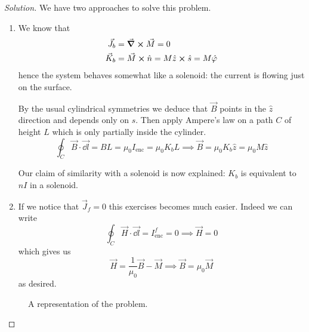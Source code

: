 \documentclass[12pt]{extarticle}
\begin{document}
\begin{proof}[Solution]
    We have two approaches to solve this problem.
    \begin{enumerate}
        \item We know that
              \begin{align}
                  \vec J_b & = \curl \vec M = 0                                               \\
                  \vec K_b & = \vec M \cross \hat n = M \hat z \cross \hat s = M \hat \varphi
              \end{align}
              hence the system behaves somewhat like a solenoid:
              the current is flowing just on the surface.

              By the usual cylindrical symmetries we deduce that $\vec B$ points in the $\hat z$ direction
              and depends only on $s$.
              Then apply Ampere's law on a path $C$ of height $L$ which is only partially inside the cylinder.
              \begin{equation}
                  \oint_C \vec B \cdot \vec{\dd l} = B L = \mu_0 I_\text{enc} = \mu_0 K_b L
                  \implies \vec B = \mu_0 K_b \hat z = \mu_0 M \hat z
              \end{equation}

              Our claim of similarity with a solenoid is now explained: $K_b$ is equivalent to $nI$ in a solenoid.

        \item If we notice that $\vec J_f = 0$ this exercises becomes much easier.
              Indeed we can write
              \begin{equation}
                  \oint_C \vec H \cdot \vec{\dd l} = I_\text{enc}^f = 0
                  \implies \vec H = 0
              \end{equation}
              which gives us
              \begin{equation}
                  \vec H = \frac{1}{\mu_0} \vec B - \vec M \implies \vec B = \mu_0 \vec M
              \end{equation}
              as desired.
    \end{enumerate}

    \begin{figure}[H]
        \centering
        
        \caption{A representation of the problem.}
    \end{figure}
\end{proof}
\end{document}
